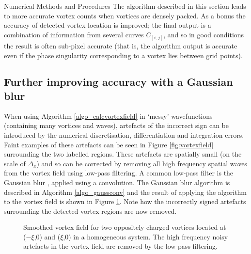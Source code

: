 \begin{chapter}{\label{cha:numerics}Numerical Methods and Procedures}
The algorithm described in this section leads to more accurate vortex counts when vortices are densely packed. As a bonus the accuracy of detected vortex location is improved; the final output is a combination of information from several curves $C_{[i,j]}$, and so in good conditions the result is often sub-pixel accurate (that is, the algorithm output is accurate even if the phase singularity corresponding to a vortex lies between grid points). 

\subsection{\label{section:gaussianblur} Further improving accuracy with a Gaussian blur}
When using Algorithm \ref{algo_calcvortexfield} in `messy' wavefunctions (containing many vortices and waves), artefacts of the incorrect sign can be introduced by the numerical discretisation, differentiation and integration errors. Faint examples of these artefacts can be seen in Figure \ref{fig:vortexfield} surrounding the two labelled regions. These artefacts are spatially small (on the scale of $\Delta_x$) and so can be corrected by removing all high frequency spatial waves from the vortex field using low-pass filtering. A common low-pass filter is the Gaussian blur \cite{shapiro2001computer}, applied using a convolution. The Gaussian blur algorithm is described in Algorithm \ref{algo_gaussconv} and the result of applying the algorithm to the vortex field is shown in Figure \ref{fig:vortexfieldsmooth}. Note how the incorrectly signed artefacts surrounding the detected vortex regions are now removed.
\begin{figure}[!ht]
  \centering
  \caption{Smoothed vortex field for two oppositely charged vortices located at ($-\xi$,0) and ($\xi$,0) in a homogeneous system. The high frequency noisy artefacts in the vortex field are removed by the low-pass filtering.\label{fig:vortexfieldsmooth} }
 \end{figure}


\end{chapter}
